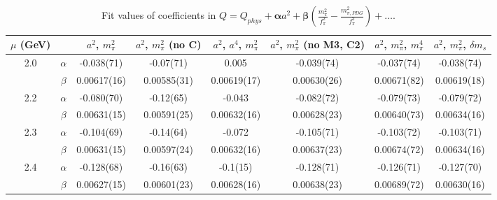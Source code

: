 \documentclass[12pt]{extarticle}
\begin{document}
\begin{table}[h!]
\begin{center}
\begin{tabular}{|c c|c|c|c|c|c|c|}
\hline
$\mu$ (GeV) &  & $a^2$, $m_\pi^2$& $a^2$, $m_\pi^2$ (no C)& $a^2$, $a^4$, $m_\pi^2$& $a^2$, $m_\pi^2$ (no M3, C2)& $a^2$, $m_\pi^2$, $m_\pi^4$& $a^2$, $m_\pi^2$, $\delta m_s$\\
\hline
\multirow{2}{0.5in}{2.0} & $\alpha$ & -0.038(71)& -0.07(71)& 0.005& -0.039(74)& -0.037(74)& -0.038(74)\\
 & $\beta$ & 0.00617(16)& 0.00585(31)& 0.00619(17)& 0.00630(26)& 0.00671(82)& 0.00619(18)\\
\hline
\multirow{2}{0.5in}{2.2} & $\alpha$ & -0.080(70)& -0.12(65)& -0.043& -0.082(72)& -0.079(73)& -0.079(72)\\
 & $\beta$ & 0.00631(15)& 0.00591(25)& 0.00632(16)& 0.00628(23)& 0.00640(73)& 0.00634(16)\\
\hline
\multirow{2}{0.5in}{2.3} & $\alpha$ & -0.104(69)& -0.14(64)& -0.072& -0.105(71)& -0.103(72)& -0.103(71)\\
 & $\beta$ & 0.00631(15)& 0.00597(24)& 0.00632(16)& 0.00637(23)& 0.00674(72)& 0.00634(16)\\
\hline
\multirow{2}{0.5in}{2.4} & $\alpha$ & -0.128(68)& -0.16(63)& -0.1(15)& -0.128(71)& -0.126(71)& -0.127(70)\\
 & $\beta$ & 0.00627(15)& 0.00601(23)& 0.00628(16)& 0.00638(23)& 0.00689(72)& 0.00630(16)\\
\hline
\end{tabular}
\caption{Fit values of coefficients in $Q = Q_{phys} + \mathbf{\alpha} a^2 + \mathbf{\beta}\left(\frac{m_\pi^2}{f_\pi^2}-\frac{m_{\pi,PDG}^2}{f_\pi^2}\right) + \ldots$.}
\end{center}
\end{table}
























\clearpage
\end{document}
